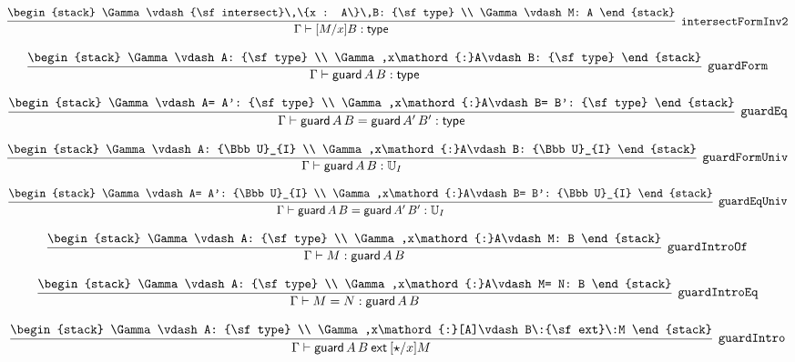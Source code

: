 \[
\infer[{\tt intersectFormInv2}]{\Gamma \vdash [M/x]B: {\sf type}}{
\begin{stack}
\Gamma \vdash {\sf intersect}\,\{x : A\}\,B: {\sf type}
\\
\Gamma \vdash M: A
\end{stack}}
\]

\[
\infer[{\tt guardForm}]{\Gamma \vdash {\sf guard}\,A\,B: {\sf type}}{
\begin{stack}
\Gamma \vdash A: {\sf type}
\\
\Gamma ,x\mathord{:}A\vdash B: {\sf type}
\end{stack}}
\]

\[
\infer[{\tt guardEq}]{\Gamma \vdash {\sf guard}\,A\,B= {\sf guard}\,A'\,B': {\sf type}}{
\begin{stack}
\Gamma \vdash A= A': {\sf type}
\\
\Gamma ,x\mathord{:}A\vdash B= B': {\sf type}
\end{stack}}
\]

\[
\infer[{\tt guardFormUniv}]{\Gamma \vdash {\sf guard}\,A\,B: {\Bbb U}_{I}}{
\begin{stack}
\Gamma \vdash A: {\Bbb U}_{I}
\\
\Gamma ,x\mathord{:}A\vdash B: {\Bbb U}_{I}
\end{stack}}
\]

\[
\infer[{\tt guardEqUniv}]{\Gamma \vdash {\sf guard}\,A\,B= {\sf guard}\,A'\,B': {\Bbb U}_{I}}{
\begin{stack}
\Gamma \vdash A= A': {\Bbb U}_{I}
\\
\Gamma ,x\mathord{:}A\vdash B= B': {\Bbb U}_{I}
\end{stack}}
\]

\[
\infer[{\tt guardIntroOf}]{\Gamma \vdash M: {\sf guard}\,A\,B}{
\begin{stack}
\Gamma \vdash A: {\sf type}
\\
\Gamma ,x\mathord{:}A\vdash M: B
\end{stack}}
\]

\[
\infer[{\tt guardIntroEq}]{\Gamma \vdash M= N: {\sf guard}\,A\,B}{
\begin{stack}
\Gamma \vdash A: {\sf type}
\\
\Gamma ,x\mathord{:}A\vdash M= N: B
\end{stack}}
\]

\[
\infer[{\tt guardIntro}]{\Gamma \vdash {\sf guard}\,A\,B\:{\sf ext}\:[\star /x]M}{
\begin{stack}
\Gamma \vdash A: {\sf type}
\\
\Gamma ,x\mathord{:}[A]\vdash B\:{\sf ext}\:M
\end{stack}}
\]

